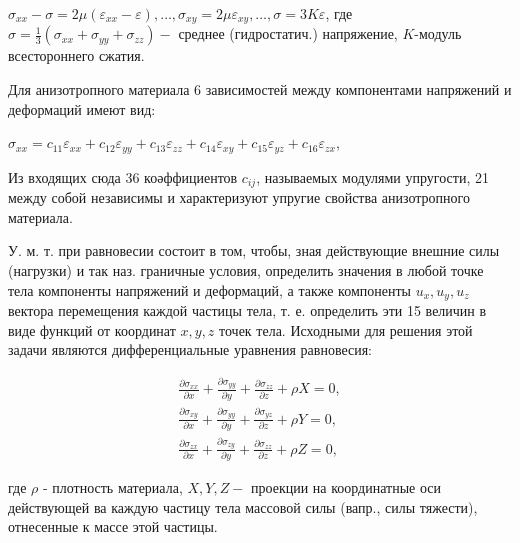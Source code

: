 \documentclass[10pt]{article}
\begin{document}
$\sigma_{x x}-\sigma=2 \mu\left(\varepsilon_{x x}-\varepsilon\right), \ldots, \sigma_{x y}=2 \mu \varepsilon_{x y}, \ldots, \sigma=3 K \varepsilon$, где $\sigma=\frac{1}{3}\left(\sigma_{x x}+\sigma_{y y}+\sigma_{z z}\right)-$ среднее (гидростатич.) напряжение, $K$-модуль всестороннего сжатия.



Для анизотропного материала 6 зависимостей между компонентами напряжений и деформаций имеют вид:



$\sigma_{x x}=c_{11} \varepsilon_{x x}+c_{12} \varepsilon_{y y}+c_{13} \varepsilon_{z z}+c_{14} \varepsilon_{x y}+c_{15} \varepsilon_{y z}+c_{16} \varepsilon_{z x}$,



Из входящих сюда 36 коәффициентов $c_{i j}$, называемых модулями упругости, 21 между собой независимы и характеризуют упругие свойства анизотропного материала.



У. м. т. при равновесии состоит в том, чтобы, зная действующие внешние силы (нагрузки) и так наз. граничные условия, определить значения в любой точке тела компоненты напряжений и деформаций, а также компоненты $u_{x}, u_{y}, u_{z}$ вектора перемещения каждой частицы тела, т. е. определить эти 15 величин в виде функций от координат $x, y, z$ точек тела. Исходными для решения этой задачи являются дифференциальные уравнения равновесия:



\[

\begin{gathered}

\frac{\partial \sigma_{x x}}{\partial x}+\frac{\partial \sigma_{y y}}{\partial y}+\frac{\partial \sigma_{z z}}{\partial z}+\rho X=0, \\

\frac{\partial \sigma_{x y}}{\partial x}+\frac{\partial \sigma_{y y}}{\partial y}+\frac{\partial \sigma_{y z}}{\partial z}+\rho Y=0, \\

\frac{\partial \sigma_{z x}}{\partial x}+\frac{\partial \sigma_{z y}}{\partial y}+\frac{\partial \sigma_{z z}}{\partial z}+\rho Z=0,

\end{gathered}

\]



где $\rho$ - плотность материала, $X, Y, Z-$ проекции на координатные оси действующей ва каждую частицу тела массовой силы (вапр., силы тяжести), отнесенные к массе этой частицы.
\end{document}
